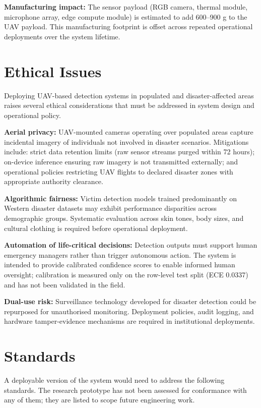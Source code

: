 \textbf{Manufacturing impact:} The sensor payload (RGB camera, thermal module, microphone array, edge compute module) is estimated to add 600--900 g to the UAV payload. This manufacturing footprint is offset across repeated operational deployments over the system lifetime.

\section{Ethical Issues}

Deploying UAV-based detection systems in populated and disaster-affected areas raises several ethical considerations that must be addressed in system design and operational policy.

\textbf{Aerial privacy:} UAV-mounted cameras operating over populated areas capture incidental imagery of individuals not involved in disaster scenarios. Mitigations include: strict data retention limits (raw sensor streams purged within 72 hours); on-device inference ensuring raw imagery is not transmitted externally; and operational policies restricting UAV flights to declared disaster zones with appropriate authority clearance.

\textbf{Algorithmic fairness:} Victim detection models trained predominantly on Western disaster datasets may exhibit performance disparities across demographic groups. Systematic evaluation across skin tones, body sizes, and cultural clothing is required before operational deployment.

\textbf{Automation of life-critical decisions:} Detection outputs must support human emergency managers rather than trigger autonomous action. The system is intended to provide calibrated confidence scores to enable informed human oversight; calibration is measured only on the row-level test split (ECE 0.0337) and has not been validated in the field.

\textbf{Dual-use risk:} Surveillance technology developed for disaster detection could be repurposed for unauthorised monitoring. Deployment policies, audit logging, and hardware tamper-evidence mechanisms are required in institutional deployments.

\section{Standards}

A deployable version of the system would need to address the following standards. The research prototype has not been assessed for conformance with any of them; they are listed to scope future engineering work.

